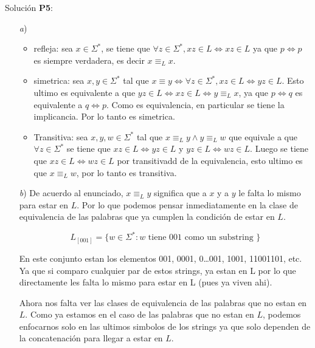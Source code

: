 \documentclass[letterpaper,11pt]{article}
\theoremstyle{plain}
\begin{document}
    \begin{framed}
        Solución \textbf{P5}:
        
        \begin{enumerate}
            \item[\textit{a})]
                \begin{itemize}
                    \item refleja: sea $x\in \Sigma^*$, se tiene que $\forall z\in \Sigma^*, xz\in L \Leftrightarrow xz \in L$ ya que $p\Leftrightarrow p$ es siempre verdadera, es decir $x \equiv_L x$.
                    \item simetrica: sea $x,y \in \Sigma^*$ tal que $x \equiv y \iff \forall z\in \Sigma^*, xz \in L \Leftrightarrow yz \in L$. Esto ultimo es equivalente a que $yz \in L \Leftrightarrow xz \in L \iff y \equiv_L x$, ya que $p\Leftrightarrow q$ es equivalente a $q\Leftrightarrow p$. Como es equivalencia, en particular se tiene la implicancia. Por lo tanto es simetrica.
                    \item Transitiva: sea $x,y,w \in \Sigma^*$ tal que $x\equiv_L y \land y \equiv_L w$ que equivale a  que $\forall z\in \Sigma^*$ se tiene que $xz \in L \Leftrightarrow yz \in L$ y $yz \in L \Leftrightarrow wz \in L$. Luego se tiene que  $xz \in L \Leftrightarrow wz \in L$ por transitivadd de la equivalencia, esto ultimo es que $x \equiv_L w$, por lo tanto es transitiva.
                \end{itemize}
                
            \item[\textit{b})]
                De acuerdo al enunciado, $x\equiv_L y$ significa que a $x$ y a $y$ le falta lo mismo para estar en $L$. Por lo que podemos pensar inmediatamente en la clase de equivalencia de las palabras que ya cumplen la condición de estar en $L$.
                
                    $$L_{[001]}=\{w \in \Sigma^*: w \text{ tiene } 001  \text{ como un substring }\}$$
                
                En este conjunto estan los elementos 001, 0001, 0\dots001, 1001, 11001101, etc. Ya que si comparo cualquier par de estos strings, ya estan en L por lo que directamente les falta lo mismo para estar en L (pues ya viven ahi).
                
                Ahora nos falta ver las clases de equivalencia de las palabras que no estan en $L$. Como ya estamos en el caso de las palabras que no estan en $L$, podemos enfocarnos solo en las ultimos simbolos de los strings ya que solo dependen de la concatenación para llegar a estar en $L$.
                

\end{enumerate}
\end{framed}
\end{document}
